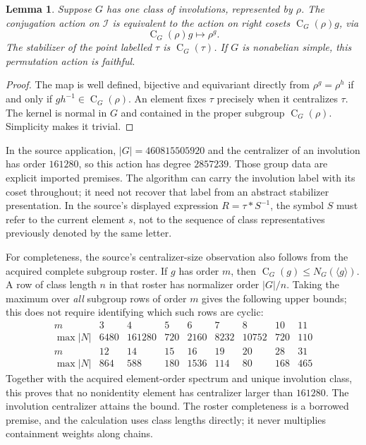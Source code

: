 \documentclass[11pt]{article}
\newtheorem{lemma}[theorem]{Lemma}
\newcommand{\C}{\operatorname{C}}
\begin{document}
\begin{lemma}
Suppose $G$ has one class of involutions, represented by $\rho$.
The conjugation action on $\mathcal I$ is equivalent to the action on
right cosets $\C_G(\rho)g$, via
\[
 \C_G(\rho)g\longmapsto \rho^g.
\]
The stabilizer of the point labelled $\tau$ is $\C_G(\tau)$.
If $G$ is nonabelian simple, this permutation action is faithful.
\end{lemma}
\begin{proof}
The map is well defined, bijective and equivariant directly from
$\rho^g=\rho^h$ if and only if $gh^{-1}\in\C_G(\rho)$.
An element fixes $\tau$ precisely when it centralizes $\tau$.
The kernel is normal in $G$ and contained in the proper subgroup
$\C_G(\rho)$. Simplicity makes it trivial.
\end{proof}

In the source application, $|G|=460815505920$ and the centralizer of an
involution has order $161280$, so this action has degree $2857239$.
Those group data are explicit imported premises. The algorithm can
carry the involution label with its coset throughout; it need not
recover that label from an abstract stabilizer presentation. In the
source's displayed expression $R=\tau*S^{-1}$, the symbol $S$ must
refer to the current element $s$, not to the sequence of class
representatives previously denoted by the same letter.

For completeness, the source's centralizer-size observation also follows
from the acquired complete subgroup roster. If $g$ has order $m$, then
$\C_G(g)\le N_G(\langle g\rangle)$. A row of class length $n$ in that
roster has normalizer order $|G|/n$. Taking the maximum over \emph{all}
subgroup rows of order $m$ gives the following upper bounds; this does
not require identifying which such rows are cyclic:
\[
\begin{array}{c|rrrrrrrr}
m&3&4&5&6&7&8&10&11\\
\max |N|&6480&161280&720&2160&8232&10752&720&110\\\hline
m&12&14&15&16&19&20&28&31\\
\max |N|&864&588&180&1536&114&80&168&465
\end{array}
\]
Together with the acquired element-order spectrum and unique involution
class, this proves that no nonidentity element has centralizer larger
than $161280$. The involution centralizer attains the bound. The roster
completeness is a borrowed premise, and the calculation uses class
lengths directly; it never multiplies containment weights along chains.
\end{document}
